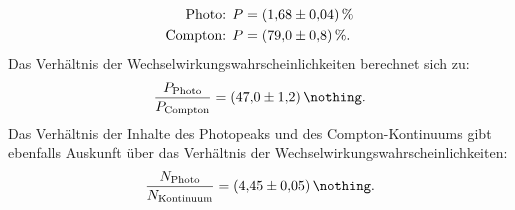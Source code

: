 \begin{align*}
	\text{Photo: }		& P= \SI{1.68 (4)}{\%} \\
	\text{Compton: }	& P= \SI{79.0 (8)}{\%}. \\
\end{align*}
Das Verhältnis der Wechselwirkungswahrscheinlichkeiten berechnet sich zu:
\begin{equation*}
	\frac{ P_{\text{Photo} } }{ P_{ \text{Compton} } } = \SI{47.0 (12)}{\nothing}.
\end{equation*}
Das Verhältnis der Inhalte des Photopeaks und des Compton-Kontinuums gibt ebenfalls Auskunft über das Verhältnis der Wechselwirkungswahrscheinlichkeiten:
\begin{equation*}
	\frac{ N_{\text{Photo}} }{ N_{\text{Kontinuum}} } = \SI{4.45 (5)}{\nothing}.
\end{equation*}
\FloatBarrier





